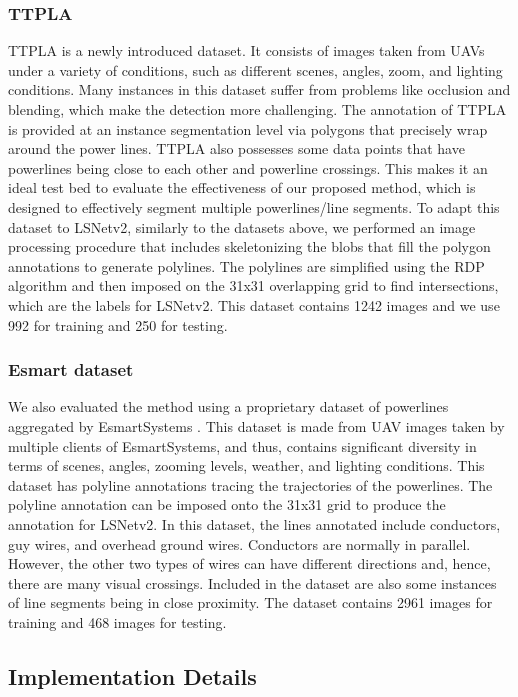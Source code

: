\documentclass[journal]{IEEEtran}
\begin{document}
\subsubsection{TTPLA}

TTPLA \cite{TTPLA} is a newly introduced dataset. It consists of images taken from UAVs under a variety of conditions, such as different scenes, angles, zoom, and lighting conditions. Many instances in this dataset suffer from problems like occlusion and blending, which make the detection more challenging. The annotation of TTPLA is provided at an instance segmentation level via polygons that precisely wrap around the power lines. TTPLA also possesses some data points that have powerlines being close to each other and powerline crossings. This makes it an ideal test bed to evaluate the effectiveness of our proposed method, which is designed to effectively segment multiple powerlines/line segments. To adapt this dataset to LSNetv2, similarly to the datasets above, we performed an image processing procedure that includes skeletonizing the blobs that fill the polygon annotations to generate polylines. The polylines are simplified using the RDP algorithm and then imposed on the 31x31 overlapping grid to find intersections, which are the labels for LSNetv2. This dataset contains 1242 images and we use 992 for training and 250 for testing.

\subsubsection{Esmart dataset}
We also evaluated the method using a proprietary dataset of powerlines aggregated by EsmartSystems \cite{esmart_website}. This dataset is made from UAV images taken by multiple clients of EsmartSystems, and thus, contains significant diversity in terms of scenes, angles, zooming levels, weather, and lighting conditions. This dataset has polyline annotations tracing the trajectories of the powerlines. The polyline annotation can be imposed onto the 31x31 grid to produce the annotation for LSNetv2.
In this dataset, the lines annotated include conductors, guy wires, and overhead ground wires. Conductors are normally in parallel. However, the other two types of wires can have different directions and, hence, there are many visual crossings. Included in the dataset are also some instances of line segments being in close proximity. The dataset contains 2961 images for training and 468 images for testing.


\subsection{Implementation Details}
\end{document}
